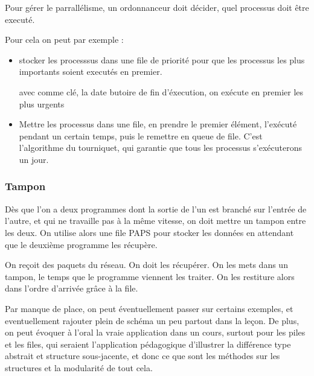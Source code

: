     Pour gérer le parrallélisme, un ordonnanceur doit décider, quel processus doit être executé.

Pour cela on peut par exemple : \begin{itemize}
	\item stocker les processsus dans une file de priorité pour que les processus les plus importants soient executés en premier.
\begin{example} avec comme clé, la date butoire de fin d'éxecution, on exécute en premier les plus urgents
\end{example}
	\item Mettre les processus dans une file, en prendre le premier élément, l'exécuté pendant un certain temps, puis le remettre en queue de file. C'est l'algorithme du tourniquet, qui garantie que tous les processus s'exécuterons un jour.
\end{itemize}

\subsubsection{Tampon}
	
	Dès que l'on a deux programmes dont la sortie de l'un est branché sur l'entrée de l'autre, et qui ne travaille pas à la même vitesse, on doit mettre un tampon entre les deux. On utilise alors une file PAPS pour stocker les données en attendant que le deuxième programme les récupère.
	
	\begin{example}
		On reçoit des paquets du réseau. On doit les récupérer. On les mets dans un tampon, le temps que le programme viennent les traiter. On les restiture alors dans l'ordre d'arrivée grâce à la file.
	\end{example}

\begin{com}
	Par manque de place, on peut éventuellement passer sur certains exemples, et eventuellement rajouter plein de schéma un peu partout dans la leçon. De plus, on peut évoquer à l'oral la vraie application dans un cours, surtout pour les piles et les files, qui seraient l'application pédagogique d'illustrer la différence type abstrait et structure sous-jacente, et donc ce que sont les méthodes sur les structures et la modularité de tout cela.
\end{com}